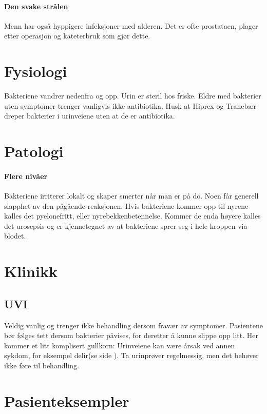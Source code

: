 			\paragraph{Den svake strålen\\}
				Menn har også hyppigere infeksjoner med alderen. Det er ofte prostataen, plager etter operasjon og kateterbruk som gjør dette. 
		\section{Fysiologi}
			Bakteriene vandrer nedenfra og opp. Urin er steril hos friske. Eldre med bakterier uten symptomer trenger vanligvis ikke antibiotika. Husk at Hiprex \textregistered og Tranebær dreper bakterier i urinveiene uten at de er antibiotika. 
		\section{Patologi}
			\paragraph{Flere nivåer\\}
				Bakteriene irriterer lokalt og skaper smerter når man er på do. Noen får generell slapphet av den pågående reaksjonen. Hvis bakteriene kommer opp til nyrene kalles det pyelonefritt, eller nyrebekkenbetennelse. Kommer de enda høyere kalles det urosepsis og er kjennetegnet av at bakteriene sprer seg i hele kroppen via blodet. 
		\section{Klinikk}
			\subsection{UVI}
				Veldig vanlig og trenger ikke behandling dersom fravær av symptomer. Pasientene bør følges tett dersom bakterier påvises, for deretter å kunne slippe opp litt. Her kommer et litt komplisert gullkorn: Urinveiene kan være årsak ved annen sykdom, for eksempel delir(se side \pageref{chap:delir}). Ta urinprøver regelmessig, men det behøver ikke føre til behandling.
		\section{Pasienteksempler}
